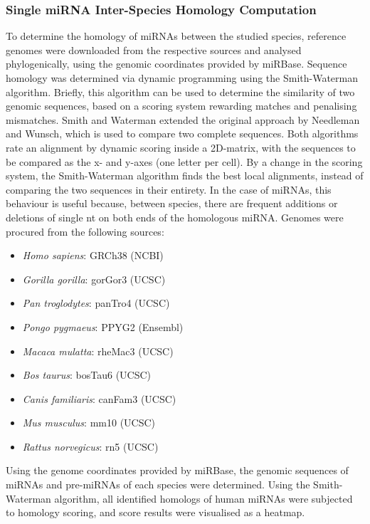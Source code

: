 \begin{method}
\subsubsection{Single miRNA Inter-Species Homology Computation}
To determine the homology of miRNAs between the studied species, reference genomes were downloaded from the respective sources and analysed phylogenically, using the genomic coordinates provided by miRBase. Sequence homology was determined via dynamic programming using the Smith-Waterman algorithm\cite{Smith1981}. Briefly, this algorithm can be used to determine the similarity of two genomic sequences, based on a scoring system rewarding matches and penalising mismatches. Smith and Waterman extended the original approach by Needleman and Wunsch\cite{Needleman1970}, which is used to compare two complete sequences. Both algorithms rate an alignment by dynamic scoring inside a 2D-matrix, with the sequences to be compared as the x- and y-axes (one letter per cell). By a change in the scoring system, the Smith-Waterman algorithm finds the best local alignments, instead of comparing the two sequences in their entirety. In the case of miRNAs, this behaviour is useful because, between species, there are frequent additions or deletions of single \ac{nt} on both ends of the homologous miRNA. Genomes were procured from the following sources:
\begin{itemize}[noitemsep, leftmargin=.5cm, label={\tiny\raisebox{1ex}{\textbullet}}]
\item \emph{Homo sapiens}: GRCh38 (NCBI)
\item \emph{Gorilla gorilla}: gorGor3 (UCSC)
\item \emph{Pan troglodytes}: panTro4 (UCSC)
\item \emph{Pongo pygmaeus}: PPYG2 (Ensembl)
\item \emph{Macaca mulatta}: rheMac3 (UCSC)
\item \emph{Bos taurus}: bosTau6 (UCSC)
\item \emph{Canis familiaris}: canFam3 (UCSC)
\item \emph{Mus musculus}: mm10 (UCSC)
\item \emph{Rattus norvegicus}: rn5 (UCSC)
\end{itemize}

Using the genome coordinates provided by miRBase, the genomic sequences of miRNAs and pre-miRNAs of each species were determined. Using the Smith-Waterman algorithm, all identified homologs of human miRNAs were subjected to homology scoring, and score results were visualised as a heatmap.

\end{method}

